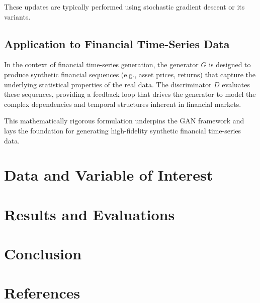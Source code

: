 \documentclass{article}
\begin{document}
These updates are typically performed using stochastic gradient descent or its variants.

\subsection*{Application to Financial Time-Series Data}

In the context of financial time-series generation, the generator $ G $ is designed to produce synthetic financial sequences (e.g., asset prices, returns) that capture the underlying statistical properties of the real data. The discriminator $ D $ evaluates these sequences, providing a feedback loop that drives the generator to model the complex dependencies and temporal structures inherent in financial markets.

This mathematically rigorous formulation underpins the GAN framework and lays the foundation for generating high-fidelity synthetic financial time-series data.

\section{Data and Variable of Interest}

\section{Results and Evaluations}

\section{Conclusion}

\section{References}
\printbibliography
\end{document}
